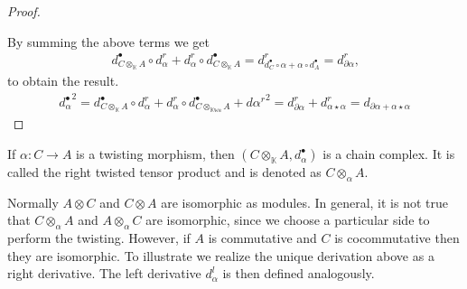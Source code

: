 \documentclass[../thesis.tex]{subfiles}
\begin{document}
\begin{proof}
\begin{center}
\begin{tikzpicture}
                    \end{tikzpicture}
                \end{center}

                By summing the above terms we get 
                \begin{align*}
                    d_{C\otimes_\mathbb{K}A}^\bullet\circ d_\alpha^r + d_\alpha^r\circ d_{C\otimes_\mathbb{K} A}^\bullet = d_{d_C^\bullet\circ\alpha + \alpha\circ d_A^\bullet}^r = d_{\partial\alpha}^r\text{,}
                \end{align*}
                to obtain the result.
                \begin{align*}
                    {d_\alpha^\bullet}^2 = d_{C\otimes_\mathbb{K}A}^\bullet \circ d_\alpha^r + d_\alpha^r \circ d_{C\otimes_\mathbb{Kwe}A}^\bullet + {d\alpha^r}^2 = d_{\partial \alpha}^r + d_{\alpha\star\alpha}^r = d_{\partial \alpha + \alpha\star\alpha}
                \end{align*}
            \end{proof}

            \begin{corollary}
                If $\alpha:C\rightarrow A$ is a twisting morphism, then $(C\otimes_\mathbb{K}A, d_\alpha^\bullet)$ is a chain complex. It is called the right twisted tensor product and is denoted as $C\otimes_\alpha A$.
            \end{corollary}

            Normally $A\otimes C$ and $C\otimes A$ are isomorphic as modules. In general, it is not true that $C\otimes_\alpha A$ and $A\otimes_\alpha C$ are isomorphic, since we choose a particular side to perform the twisting. However, if $A$ is commutative and $C$ is cocommutative then they are isomorphic. To illustrate we realize the unique derivation above as a right derivative. The left derivative $d_\alpha^l$ is then defined analogously.
            \begin{center}
            \end{center}
\end{document}
